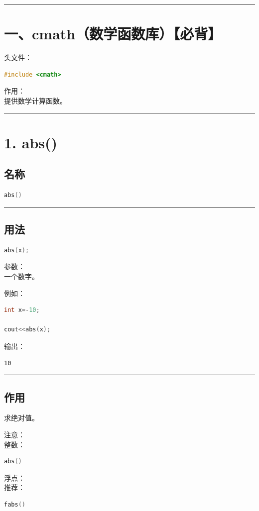 \documentclass[10pt,twocolumn]{extarticle}
\begin{document}
\noindent\rule{\linewidth}{0.4pt}

\section{一、cmath（数学函数库）\textbf{【必背】}}

头文件：
\begin{lstlisting}[language=C++]
#include <cmath>
\end{lstlisting}
作用：\\
提供数学计算函数。

\noindent\rule{\linewidth}{0.4pt}

\section{1. abs()}

\subsection{名称}
\begin{lstlisting}[language=C++]
abs()
\end{lstlisting}

\noindent\rule{\linewidth}{0.4pt}

\subsection{用法}
\begin{lstlisting}[language=C++]
abs(x);
\end{lstlisting}
参数：\\
一个数字。

例如：
\begin{lstlisting}[language=C++]
int x=-10;

cout<<abs(x);
\end{lstlisting}
输出：
\begin{lstlisting}
10
\end{lstlisting}

\noindent\rule{\linewidth}{0.4pt}

\subsection{作用}
求绝对值。

注意：\\
整数：
\begin{lstlisting}[language=C++]
abs()
\end{lstlisting}
浮点：\\
推荐：
\begin{lstlisting}[language=C++]
fabs()
\end{lstlisting}
\end{document}

